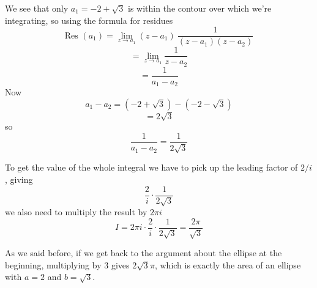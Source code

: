 \documentclass[11pt, oneside]{article}   	%
\begin{document}
We see that only $a_1 = -2 + \sqrt{3}$ is within the contour over which we're integrating, so using the formula for residues
\[ \text{Res }(a_1) = \lim_{z \rightarrow a_1} (z - a_1) \ \frac{1}{(z - a_1)(z - a_2)} \]
\[ = \lim_{z \rightarrow a_1} \frac{1}{z - a_2} \]
\[ = \frac{1}{a_1 - a_2} \]
Now
\[ a_1 - a_2 = (-2 + \sqrt{3} ) - (-2 - \sqrt{3} ) \]
\[ = 2 \sqrt{3} \]
so
\[ \frac{1}{a_1 - a_2} = \frac{1}{2 \sqrt{3}} \]

To get the value of the whole integral we have to pick up the leading factor of $2/i$, giving
\[ \frac{2}{i} \cdot \frac{1}{2 \sqrt{3}} \]
we also need to multiply the result by $2 \pi i$
\[ I = 2 \pi i \cdot \frac{2}{i} \cdot \frac{1}{2 \sqrt{3}} = \frac{2 \pi}{\sqrt{3}} \]

As we said before, if we get back to the argument about the ellipse at the beginning, multiplying by $3$ gives $2 \sqrt{3} \pi$, which is exactly the area of an ellipse with $a = 2$ and $b = \sqrt{3}$.
\end{document}
